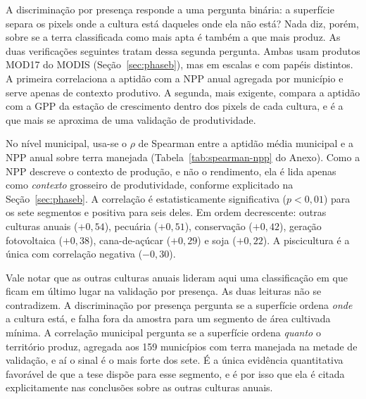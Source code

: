 \begin{table}[htbp]
\centering
\caption{Discriminação por presença: superfícies de aptidão confrontadas com a presença atual
de culturas (AUC e índice de Boyce, amostra estratificada por espaço e segmento).}
\label{tab:presence-auc}
\small

\end{table}

A discriminação por presença responde a uma pergunta binária: a superfície separa os pixels onde a
cultura está daqueles onde ela não está? Nada diz, porém, sobre se a terra classificada como mais
apta é também a que mais produz. As duas verificações seguintes tratam dessa segunda pergunta. Ambas
usam produtos MOD17 do MODIS (Seção~\ref{sec:phaseb}), mas em escalas e com papéis distintos. A
primeira correlaciona a aptidão com a NPP anual agregada por município e serve apenas de contexto
produtivo. A segunda, mais exigente, compara a aptidão com a GPP da estação de crescimento dentro
dos pixels de cada cultura, e é a que mais se aproxima de uma validação de produtividade.

No nível municipal, usa-se o $\rho$ de Spearman entre a aptidão média municipal e a NPP anual sobre
terra manejada (Tabela~\ref{tab:spearman-npp} do Anexo). Como a NPP descreve o contexto de produção,
e não o rendimento, ela é lida apenas como \emph{contexto} grosseiro de produtividade, conforme
explicitado na Seção~\ref{sec:phaseb}. A correlação é estatisticamente
significativa ($p < 0{,}01$) para os sete segmentos e positiva para seis deles. Em ordem decrescente:
outras culturas anuais ($+0{,}54$), pecuária ($+0{,}51$), conservação ($+0{,}42$), geração
fotovoltaica ($+0{,}38$), cana-de-açúcar ($+0{,}29$) e soja ($+0{,}22$). A piscicultura é a única
com correlação negativa ($-0{,}30$).

Vale notar que as outras culturas anuais lideram aqui uma classificação em que ficam em último lugar
na validação por presença. As duas leituras não se contradizem. A discriminação por presença pergunta
se a superfície ordena \emph{onde} a cultura está, e falha fora da amostra para um segmento de área
cultivada mínima. A correlação municipal pergunta se a superfície ordena \emph{quanto} o território
produz, agregada aos 159 municípios com terra manejada na metade de validação, e aí o sinal é o mais
forte dos sete. É a única evidência quantitativa favorável de que a tese dispõe para esse segmento, e
é por isso que ela é citada explicitamente nas conclusões sobre as outras culturas anuais.


